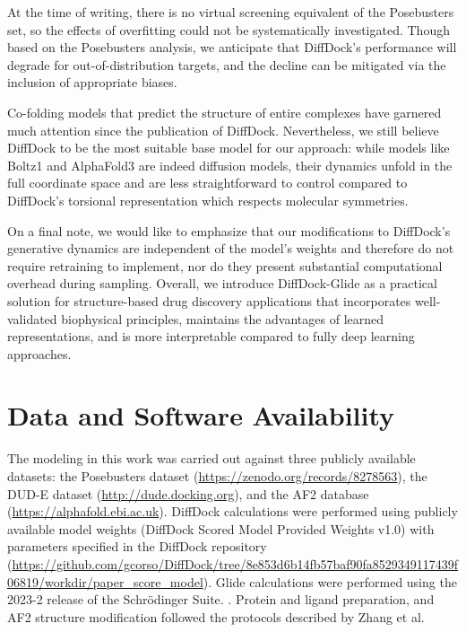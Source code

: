 \documentclass[letterpaper]{article}
\newcommand{\lh}[1]{{\color{blue}{#1}}}
\begin{document}
At the time of writing, there is no virtual screening equivalent of the Posebusters set, so the effects of overfitting could not be systematically investigated. Though based on the Posebusters analysis, we anticipate that DiffDock's performance will degrade for out-of-distribution targets, and the decline can be mitigated via the inclusion of appropriate biases. 

Co-folding models that predict the structure of entire complexes have garnered much attention since the publication of DiffDock. Nevertheless, we still believe DiffDock to be the most suitable base model for our approach: while models like Boltz1 \cite{wohlwend2024boltz1} and AlphaFold3\cite{abramson2024af3} are indeed diffusion models, their dynamics unfold in the full coordinate space and are less straightforward to control compared to DiffDock's torsional representation which respects molecular symmetries.

On a final note, we would like to emphasize that our modifications to DiffDock's generative dynamics are independent of the model's weights and therefore do not require retraining to implement, nor do they present substantial computational overhead during sampling. Overall, we introduce DiffDock-Glide as a practical solution for structure-based drug discovery applications that incorporates well-validated biophysical principles, maintains the advantages of learned representations, and is more interpretable compared to fully deep learning approaches. 

\section{Data and Software Availability}
The modeling in this work was carried out against three publicly available datasets: the Posebusters dataset (\url{https://zenodo.org/records/8278563}), the DUD-E dataset (\url{http://dude.docking.org}), and the AF2 database (\url{https://alphafold.ebi.ac.uk}). DiffDock calculations were performed using publicly available model weights (DiffDock Scored Model Provided Weights v1.0) with parameters specified in the DiffDock repository (\url{https://github.com/gcorso/DiffDock/tree/8e853d6b14fb57baf90fa8529349117439f06819/workdir/paper_score_model}). Glide calculations were performed using the 2023-2 release of the Schr\"odinger Suite. \lh {Glide docking was performed in SP (standard precision) mode}. Protein and ligand preparation, and AF2 structure modification followed the protocols described by Zhang et al.\cite{zhang2023benchmarking}
\end{document}
